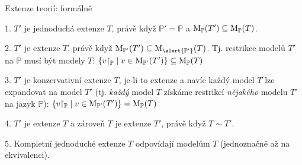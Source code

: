 \documentclass{beamer}
\begin{document}
\begin{frame}{Extenze teorií: formálně}


\vspace{-6pt}

{\small
1. $T'$ je jednoduchá extenze $T$, právě když $\mathbb P'=\mathbb P$ a $\operatorname{M}_\mathbb P(T')\subseteq\operatorname{M}_\mathbb P(T)$.

2. $T'$ je extenze $T$, právě když $\M_{\mathbb P'}(T')\subseteq\M_{\alert{\mathbb P'}}(T)$. Tj. \alert{restrikce}
modelů $T'$ na $\mathbb P$ musí být modely $T$:
\alert{$
\{v{\restriction_\mathbb P}\mid v\in\operatorname{M}_{\mathbb P'}(T')\}\subseteq\operatorname{M}_\mathbb P(T)
$}

3. $T'$ je konzervativní extenze $T$, je-li to extenze a navíc každý model $T$ lze \alert{expandovat} na model $T'$ (tj. \emph{každý} model $T$ získáme restrikcí \emph{nějakého} modelu $T'$ na jazyk $\mathbb P$):
\alert{$
\{v{\restriction_\mathbb P}\mid v\in\operatorname{M}_      {\mathbb P'}(T')\}=\operatorname{M}_\mathbb P(T)
$}

4. $T'$ je extenze $T$ a zároveň $T$ je extenze $T'$, právě když $T\sim T'$.        

5. \alert{Kompletní jednoduché extenze} $T$ \alert{odpovídají modelům} $T$ (jednoznačně až na ekvivalenci).
}

\end{frame}
\end{document}
